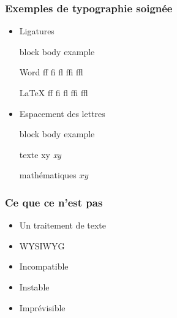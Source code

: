 \documentclass[aspectratio=54,10pt,xcolor=x11names]{beamer}
\renewenvironment{quote}{%
    \begin{beamercolorbox}[wd=\linewidth,sep=6pt]{block body example}}
    {\end{beamercolorbox}}
\theoremstyle{example}
\begin{document}
\begin{frame}
  \frametitle{Exemples de typographie soignée}
  \begin{itemize}
  \item Ligatures
    \begin{quote}
      \begin{minipage}{0.45\linewidth}
        \vspace{-12pt}
        \begin{block}{\small Word}
          \rmfamily f\/f \quad f\/i \quad f\/l \quad f\/f\/i \quad
          f\/f\/l
        \end{block}
      \end{minipage}
      \hfill
      \begin{minipage}{0.4\linewidth}
        \vspace{-12pt}
        \begin{block}{\small \LaTeX}
          \rmfamily ff \quad fi \quad fl \quad ffi \quad ffl
        \end{block}
      \end{minipage}
    \end{quote}
  \item Espacement des lettres
    \begin{quote}
      \begin{minipage}{0.45\linewidth}
        \vspace{-12pt}
        \begin{block}{\small texte}
          \rmfamily xy \quad \emph{xy}
        \end{block}
      \end{minipage}
      \hfill
      \begin{minipage}{0.4\linewidth}
        \vspace{-12pt}
        \begin{block}{\small mathématiques}
          $xy$
        \end{block}
      \end{minipage}
    \end{quote}
  \end{itemize}
\end{frame}

\begin{frame}
  \frametitle{Ce que ce n'est pas}
  \begin{itemize}
  \item Un traitement de texte
  \item WYSIWYG
  \item Incompatible
  \item Instable
  \item Imprévisible
  \end{itemize}
\end{frame}
\end{document}
